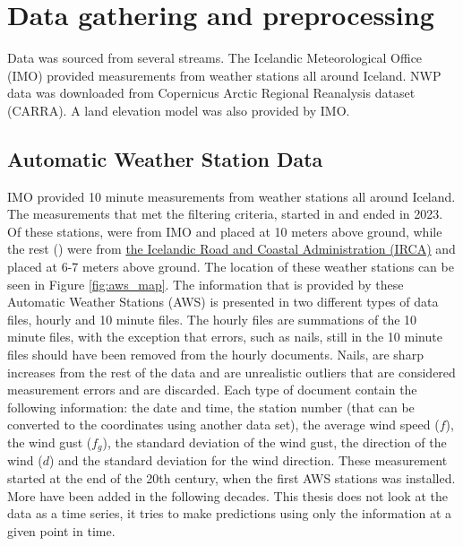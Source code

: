 
\chapter{Data gathering and preprocessing}
\label{Chapter2}
Data was sourced from several streams. The Icelandic Meteorological Office (IMO) provided measurements from weather stations all around Iceland. NWP data was downloaded from Copernicus Arctic Regional Reanalysis dataset (CARRA). A land elevation model was also provided by IMO.

\section{Automatic Weather Station Data}

IMO provided 10 minute measurements from \nStationsMin weather stations all around Iceland. The measurements that met the filtering criteria, started in \startDateVedur and ended in 2023. Of these \nStationsMin stations, \nVedurMin were from IMO and placed at 10 meters above ground, while the rest (\nVGMin) were from \href{https://www.vegagerdin.is/}{the Icelandic Road and Coastal Administration (IRCA)} and placed at 6-7 meters above ground\cite{vegagerdin_postur}. The location of these weather stations can be seen in Figure \ref{fig:aws_map}. The information that is provided by these Automatic Weather Stations (AWS) is presented in two different types of data files, hourly and 10 minute files. The hourly files are summations of the 10 minute files, with the exception that errors, such as nails, still in the 10 minute files should have been removed from the hourly documents. Nails, are sharp increases from the rest of the data and are unrealistic outliers that are considered measurement errors and are discarded. Each type of document contain the following information: the date and time, the station number (that can be converted to the coordinates using another data set), the average wind speed ($f$), the wind gust ($f_g$), the standard deviation of the wind gust, the direction of the wind ($d$) and the standard deviation for the wind direction. These measurement started at the end of the 20th century, when the first AWS stations was installed. More have been added in the following decades. This thesis does not look at the data as a time series, it tries to make predictions using only the information at a given point in time.

